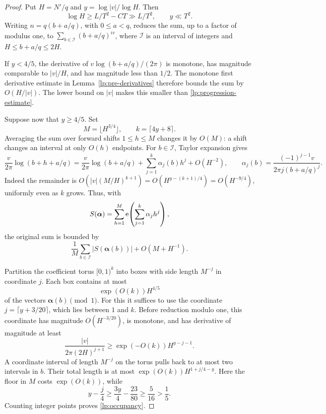 \begin{proof}
Put $H=N'/q$ and $y=\log|v|/\log H$.  Then
\begin{equation}\label{lp:phase-scales}
 \log H\ge L/T^2-CT\gg L/T^2,\qquad y\ll T^2.
\end{equation}
Writing $n=q(b+a/q)$, with $0\le a<q$, reduces the sum, up to a
factor of modulus one, to $\sum_{b\in\mathcal I}(b+a/q)^{iv}$,
where $\mathcal I$ is an interval of integers and
$H\le b+a/q\le2H$.

If $y<4/5$, the derivative of
$v\log(b+a/q)/(2\pi)$ is monotone, has magnitude comparable to
$|v|/H$, and has magnitude less than $1/2$.  The monotone first
derivative estimate in Lemma~\ref{lp:pre-derivatives} therefore bounds
the sum by $O(H/|v|)$.
The lower bound on $|v|$ makes this smaller than
\eqref{lp:progression-estimate}.

Suppose now that $y\ge4/5$.  Set
\[
 M=\lfloor H^{3/4}\rfloor,\qquad k=\lceil4y+8\rceil.
\]
Averaging the sum over forward shifts $1\le h\le M$ changes it by
$O(M)$: a shift changes an interval at only $O(h)$ endpoints.
For $b\in\mathcal I$, Taylor expansion gives
\[
 \frac{v}{2\pi}\log(b+h+a/q)
 =\frac{v}{2\pi}\log(b+a/q)
       +\sum_{j=1}^k\alpha_j(b)h^j+O(H^{-2}),
 \qquad
 \alpha_j(b)=\frac{(-1)^{j-1}v}{2\pi j(b+a/q)^j}.
\]
Indeed the remainder is
$O(|v|(M/H)^{k+1})=O(H^{y-(k+1)/4})=O(H^{-9/4})$,
uniformly even as $k$ grows.  Thus, with
\[
 S(\boldsymbol\alpha)=\sum_{h=1}^M
                 \mathrm{e}\!\left(\sum_{j=1}^k\alpha_jh^j\right),
\]
the original sum is bounded by
\begin{equation}\label{lp:shifted-phase}
 \frac1M\sum_{b\in\mathcal I}|S(\boldsymbol\alpha(b))|
       +O(M+H^{-1}).
\end{equation}

Partition the coefficient torus $[0,1)^k$ into boxes with side length
$M^{-j}$ in coordinate $j$.  Each box contains at most
\begin{equation}\label{lp:occupancy}
 \exp(O(k))H^{4/5}
\end{equation}
of the vectors $\boldsymbol\alpha(b)\pmod1$.
For this it suffices to use the coordinate
$j=\lceil y+3/20\rceil$, which lies between $1$ and $k$.
Before reduction modulo one, this coordinate has magnitude
$O(H^{-3/20})$, is monotone, and has derivative of magnitude at least
\[
 \frac{|v|}{2\pi(2H)^{j+1}}
       \ge\exp(-O(k))H^{y-j-1}.
\]
A coordinate interval of length $M^{-j}$ on the torus pulls back to
at most two intervals in $b$.  Their total length is at most
$\exp(O(k))H^{1+j/4-y}$.  Here the floor in $M$ costs
$\exp(O(k))$, while
\[
 y-\frac j4\ge\frac{3y}4-\frac{23}{80}
       \ge\frac5{16}>\frac15.
\]
Counting integer points proves \eqref{lp:occupancy}.


\end{proof}
